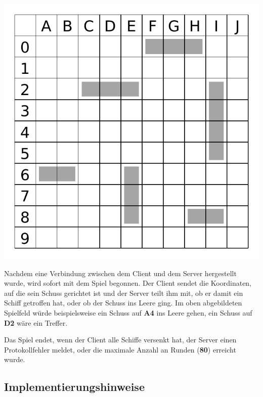 {\centering
\includegraphics[scale=0.55]{map.pdf} \par
}

Nachdem eine Verbindung zwischen dem Client und dem Server hergestellt wurde,
wird sofort mit dem Spiel begonnen.
Der Client sendet die Koordinaten, auf die sein Schuss gerichtet ist
und der Server teilt ihm mit, ob er damit ein Schiff getroffen hat,
oder ob der Schuss ins Leere ging.
Im oben abgebildeten Spielfeld würde beispielsweise ein Schuss auf \textbf{A4} ins Leere gehen,
ein Schuss auf \textbf{D2} wäre ein Treffer.

Das Spiel endet, wenn der Client alle Schiffe versenkt hat, der Server einen
Protokollfehler meldet, oder die maximale Anzahl an Runden (\textbf{80})
erreicht wurde.

\subsection*{Implementierungshinweise}
\label{sec:implhints}

\begin{center}
\end{center}

